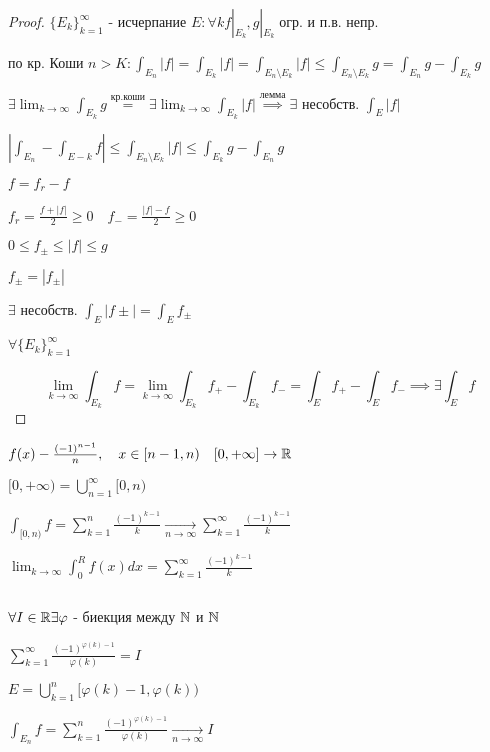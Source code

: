     \begin{proof}
        $\{E_k\}^\infty_{k=1}$ - исчерпание $E: \forall k f|\underset{E_k}{ }, g| \underset{E_k}{ }$ огр. и п.в. непр.

        по кр. Коши $n>K: \int_{E_n} |f| = \int_{E_k} |f| = \int_{E_n\setminus E_k} |f| \le
        \int_{E_n \setminus E_k} g = \int_{E_n} g - \int_{E_k}g$

        $\exists\lim_{k\to\infty} \int_{E_k} g \overset{\text{кр.коши}}{=} \exists \lim_{k\to\infty} \int_{E_k}|f| \overset{\text{лемма}}{\implies} \exists$ несобств. $\int_E |f|$

        $|\int_{E_n} - \int_{E-k}f|\le \int_{E_n\setminus E_k} |f| \le \int_{E_k}g - \int_{E_n} g$

        $f = f_r - f$

        $f_r = \frac{f + |f|}{2} \ge 0 \quad f_-= \frac{|f| - f}{2} \ge 0$

        $0 \le f_\pm \le |f| \le g$
        
        $f_\pm = |f_\pm |$

        $\exists$ несобств. $\int_E |f\pm| = \int_E f_\pm$

        $\forall \{E_k\}^\infty_{k=1}$

        $$\lim_{k\to\infty} \int_{E_k}f = \lim_{k\to\infty} \int_{E_k}f_+ - \int_{E_k} f_- = 
        \int_E f_+ - \int_E f_- \implies \exists \int_E f$$
    \end{proof}

    $f(x) - \frac{(-1)^{n-1}}{n}, \quad x \in [n-1, n) \quad [0, +\infty] \to \mathbb{R}$

    $[0, +\infty) = \bigcup^\infty_{n=1}[0, n)$

    $\int_{[0, n)} f = \sum^n_{k=1} \frac{(-1)^{k-1}}{k} \underset{n\to\infty}{\to} \sum^\infty_{k=1} \frac{(-1)^{k-1}}{k}$

    $\lim_{k\to\infty} \int^R_0 f(x)dx = \sum^\infty_{k=1}\frac{(-1)^{k-1}}{k}$

    \par $ $

    $\forall I \in \mathbb{R} \exists \varphi$ - биекция между $\mathbb{N}$ и $\mathbb{N}$

    $\sum^\infty_{k=1}\frac{(-1)^{\varphi(k)-1}}{\varphi(k)}= I$

    $E = \bigcup^n_{k=1}[\varphi(k) - 1, \varphi(k))$

    $\int_{E_n} f = \sum^n_{k=1} \frac{(-1)^{\varphi(k)-1}}{\varphi(k)} \underset{n\to\infty}{\to} I$


